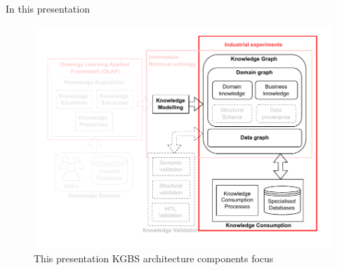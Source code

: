 \begin{frame}{In this presentation}

    \begin{figure} [H]
        \begin{center}
            \includegraphics[scale=0.5]{images/KGBS-architecture-focus-TP-expe.pdf} 
            \caption{This presentation KGBS architecture components focus} 
        \end{center}
    \end{figure}

\end{frame}